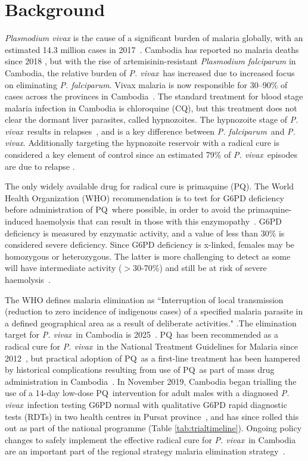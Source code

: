 \documentclass[doublespacing]{bmcart}
\newcommand{\pv}{\textit{P. vivax}}
\newcommand{\pf}{\textit{P. falciparum}}
\newcommand{\pq}{PQ}
\begin{document}
\section*{Background} 

\textit{Plasmodium vivax} is the cause of a significant burden of malaria globally, with an estimated 14.3 million cases in 2017~\cite{Battle2019}. Cambodia has reported no malaria deaths since 2018 \cite{WHOmalaria2021}, but with the rise of artemisinin-resistant \textit{Plasmodium falciparum} in Cambodia, the relative burden of \pv~has increased due to increased focus on eliminating \pf. Vivax malaria is now responsible for 30--90\% of cases across the provinces in Cambodia~\cite{WHOmalaria2021, lek2020tools, Sandfort2020}. The standard treatment for blood stage malaria infection in Cambodia is chloroquine (CQ), but this treatment does not clear the dormant liver parasites, called hypnozoites. The hypnozoite stage of \pv~results in relapses~\cite{Douglas2013, Commons2019}, and is a key difference between \pf~and \pv. Additionally targeting the hypnozoite reservoir with a radical cure is considered a key element of control since an estimated 79\% of \pv~episodes are due to relapse \cite{commons2020estimating, thriemer2021towards}.   

The only widely available drug for radical cure is primaquine (PQ). The World Health Organization (WHO) recommendation is to test for G6PD deficiency before administration of \pq~where possible, in order to avoid the primaquine-induced haemolysis that can result in those with this enzymopathy~\cite{WHO2015malaria}. G6PD deficiency is measured by enzymatic activity, and a value of less than 30\% is considered severe deficiency. Since G6PD deficiency is x-linked, females may be homozygous or heterozygous. The latter is more challenging to detect as some will have intermediate activity ($>$30-70\%) and still be at risk of severe haemolysis~\cite{Chu2017}. 

The WHO defines malaria elimination as ``Interruption of local transmission (reduction to zero incidence of indigenous cases) of a specified malaria parasite in a defined geographical area as a result of deliberate activities." \cite{who_2019_definitions}.The elimination target for \pv~in Cambodia is 2025~\cite{Cambodia}. \pq~has been recommended as a radical cure for \pv~in the National Treatment Guidelines for Malaria since 2012~\cite{nattreat_guide2014}, but practical adoption of \pq~as a first-line treatment has been hampered by historical complications resulting from use of \pq~as part of mass drug administration in Cambodia~\cite{kitchakarn2017implementation}. In November 2019, Cambodia began trialling the use of a 14-day low-dose \pq~intervention for adult males with a diagnosed \pv~infection testing G6PD normal with qualitative G6PD rapid diagnostic tests (RDTs) in two health centres in Pursat province~\cite{pursat_protocol2019}, and has since rolled this out as part of the national programme (Table \ref{tab:trialtimeline}). Ongoing policy changes to safely implement the effective radical cure for \pv~in Cambodia are an important part of the regional strategy malaria elimination strategy~\cite{ruwanpura2021further}. 
\end{document}
